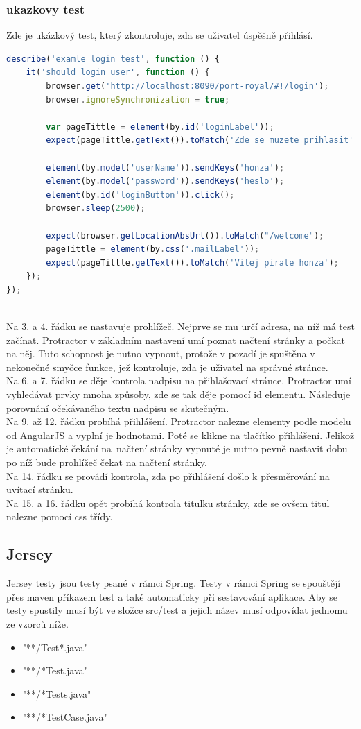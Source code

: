 \documentclass[czech,master,public,dept460,male,cpdeclaration,twoside]{diploma}
\begin{document}
\subsubsection{ukazkovy test}
Zde je ukázkový test, který zkontroluje, zda se uživatel úspěšně přihlásí.
\begin{lstlisting}[language=JavaScript, caption=Ukázkový Protractor test]
describe('examle login test', function () {
    it('should login user', function () {
        browser.get('http://localhost:8090/port-royal/#!/login');
        browser.ignoreSynchronization = true;

        var pageTittle = element(by.id('loginLabel'));
        expect(pageTittle.getText()).toMatch('Zde se muzete prihlasit');

        element(by.model('userName')).sendKeys('honza');
        element(by.model('password')).sendKeys('heslo');
        element(by.id('loginButton')).click();
        browser.sleep(2500);

        expect(browser.getLocationAbsUrl()).toMatch("/welcome");
        pageTittle = element(by.css('.mailLabel'));
        expect(pageTittle.getText()).toMatch('Vitej pirate honza');
    });
});
\end{lstlisting}
~\\
Na 3. a 4. řádku se nastavuje prohlížeč. Nejprve se mu určí adresa, na níž má test začínat. Protractor v základním nastavení umí poznat načtení stránky a počkat na něj. Tuto schopnost je nutno vypnout, protože v pozadí je spuštěna v nekonečné smyčce funkce, jež kontroluje, zda je uživatel na správné stránce.\\
Na 6. a 7. řádku se děje kontrola nadpisu na přihlašovací stránce. Protractor umí vyhledávat prvky mnoha způsoby, zde se tak děje pomocí id elementu. Následuje porovnání očekávaného textu nadpisu se skutečným.\\
Na 9. až 12. řádku probíhá přihlášení. Protractor nalezne elementy podle modelu od AngularJS a vyplní je hodnotami. Poté se klikne na tlačítko přihlášení. Jelikož je automatické čekání na~načtení stránky vypnuté je nutno pevně nastavit dobu po níž bude prohlížeč čekat na načtení stránky.\\
Na 14. řádku se provádí kontrola, zda po přihlášení došlo k přesměrování na uvítací stránku.\\
Na 15. a 16. řádku opět probíhá kontrola titulku stránky, zde se ovšem titul nalezne pomocí css třídy.

\subsection{Jersey}
Jersey testy jsou testy psané v rámci Spring. Testy v rámci Spring se spouštějí přes maven příkazem test a také automaticky při sestavování aplikace. Aby se testy spustily musí být ve složce src/test a jejich název musí odpovídat jednomu ze vzorců níže.
\begin{itemize}
	\item "**/Test*.java"
	\item "**/*Test.java"
	\item "**/*Tests.java"
	\item "**/*TestCase.java"
\end{itemize}
\end{document}
